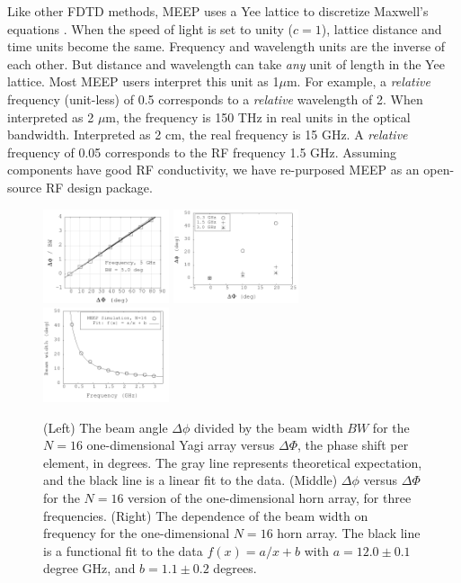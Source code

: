 \documentclass[10pt]{amsart}
\theoremstyle{definition}
\numberwithin{equation}{section}
\begin{document}
Like other FDTD methods, MEEP uses a Yee lattice to discretize Maxwell's equations \cite{10.1109/tap.1966.1138693}.  When the speed of light is set to unity ($c = 1$), lattice distance and time units become the same.  Frequency and wavelength units are the inverse of each other.  But distance and wavelength can take \textit{any} unit of length in the Yee lattice.  Most MEEP users interpret this unit as 1$\mu$m.  For example, a \textit{relative} frequency (unit-less) of 0.5 corresponds to a \textit{relative} wavelength of 2.  When interpreted as 2 $\mu$m, the frequency is 150 THz in real units in the optical bandwidth.  Interpreted as 2 cm, the real frequency is 15 GHz.  A \textit{relative} frequency of 0.05 corresponds to the RF frequency 1.5 GHz.  Assuming components have good RF conductivity, we have re-purposed MEEP as an open-source RF design package.  

\begin{figure}[ht]
\centering
\includegraphics[width=0.33\textwidth]{figures/Oct30_plot1.png}
\includegraphics[width=0.33\textwidth]{figures/Aug11_plot2.png}
\includegraphics[width=0.33\textwidth]{figures/Aug11_plot1.png}
\caption{\label{fig:pa_1} (Left) The beam angle $\Delta \phi$ divided by the beam width $BW$ for the $N = 16$ one-dimensional Yagi array versus $\Delta \Phi$, the phase shift per element, in degrees. The gray line represents theoretical expectation, and the black line is a linear fit to the data.  (Middle) $\Delta \phi$ versus $\Delta \Phi$ for the $N=16$ version of the one-dimensional horn array, for three frequencies.  (Right) The dependence of the beam width on frequency for the one-dimensional $N=16$ horn array.  The black line is a functional fit to the data $f(x) = a/x + b$ with $a=12.0\pm 0.1$ degree GHz, and $b=1.1\pm 0.2$ degrees.}
\end{figure}
\end{document}
